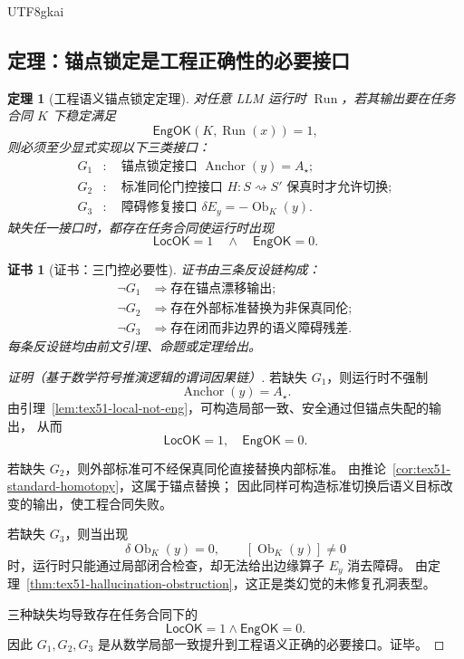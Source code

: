 \documentclass[12pt]{article}
\newtheorem{theorem}{定理}[section]
\newtheorem{Certificate}{证书}[section]
\newcommand{\LocOK}{\mathsf{LocOK}}
\newcommand{\EngOK}{\mathsf{EngOK}}
\newcommand{\Run}{\operatorname{Run}}
\newcommand{\Anchor}{\operatorname{Anchor}}
\newcommand{\Ob}{\operatorname{Ob}}
\begin{document}
\begin{CJK*}{UTF8}{gkai}
\subsection{定理：锚点锁定是工程正确性的必要接口}
\label{subsec:tex51-anchor-lock-theorem}

\begin{theorem}[工程语义锚点锁定定理]
\label{thm:tex51-anchor-lock}
对任意 LLM 运行时 \(\Run\)，若其输出要在任务合同 \(K\) 下稳定满足
\[
  \EngOK(K,\Run(x))=1,
\]
则必须至少显式实现以下三类接口：
\[
\begin{aligned}
  G_1&:\quad \text{锚点锁定接口 } \Anchor(y)=A_\star;\\
  G_2&:\quad \text{标准同伦门控接口 } H:S\rightsquigarrow S'\text{ 保真时才允许切换};\\
  G_3&:\quad \text{障碍修复接口 } \delta E_y=-\Ob_K(y).
\end{aligned}
\]
缺失任一接口时，都存在任务合同使运行时出现
\[
  \LocOK=1
  \quad\wedge\quad
  \EngOK=0.
\]
\end{theorem}

\begin{Certificate}[证书：三门控必要性]
\label{cert:tex51-anchor-lock}
证书由三条反设链构成：
\[
\begin{aligned}
  \neg G_1&\Rightarrow \text{存在锚点漂移输出};\\
  \neg G_2&\Rightarrow \text{存在外部标准替换为非保真同伦};\\
  \neg G_3&\Rightarrow \text{存在闭而非边界的语义障碍残差}.
\end{aligned}
\]
每条反设链均由前文引理、命题或定理给出。
\end{Certificate}

\begin{proof}[证明（基于数学符号推演逻辑的谓词因果链）]
若缺失 \(G_1\)，则运行时不强制
\[
  \Anchor(y)=A_\star.
\]
由引理~\ref{lem:tex51-local-not-eng}，可构造局部一致、安全通过但锚点失配的输出，
从而
\[
  \LocOK=1,\quad \EngOK=0.
\]

若缺失 \(G_2\)，则外部标准可不经保真同伦直接替换内部标准。
由推论~\ref{cor:tex51-standard-homotopy}，这属于锚点替换；
因此同样可构造标准切换后语义目标改变的输出，使工程合同失败。

若缺失 \(G_3\)，则当出现
\[
  \delta\Ob_K(y)=0,\qquad [\Ob_K(y)]\ne 0
\]
时，运行时只能通过局部闭合检查，却无法给出边缘算子 \(E_y\) 消去障碍。
由定理~\ref{thm:tex51-hallucination-obstruction}，这正是类幻觉的未修复孔洞表型。

三种缺失均导致存在任务合同下的
\[
  \LocOK=1\wedge\EngOK=0.
\]
因此 \(G_1,G_2,G_3\) 是从数学局部一致提升到工程语义正确的必要接口。证毕。
\end{proof}


\end{CJK*}
\end{document}
